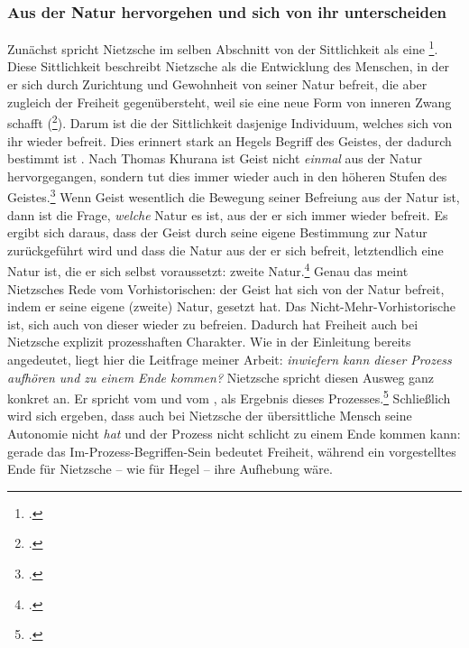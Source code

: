 \documentclass[12pt, a4paper, openany]{report}
\begin{document}
\subsubsection{Aus der Natur hervorgehen und sich von ihr unterscheiden}
Zunächst spricht Nietzsche im selben Abschnitt von der Sittlichkeit als eine \footcite[][293]{nietzsche_jenseits_2014}.
Diese Sittlichkeit beschreibt Nietzsche als die Entwicklung des Menschen, in der er sich durch Zurichtung und Gewohnheit von seiner Natur befreit, die aber zugleich der Freiheit gegenübersteht, weil sie eine neue Form von inneren Zwang schafft (\footcite[][292]{nietzsche_jenseits_2014}).
Darum ist die  der Sittlichkeit dasjenige Individuum, welches sich von ihr wieder befreit.
Dies erinnert stark an Hegels Begriff des Geistes, der dadurch bestimmt ist .
Nach Thomas Khurana ist Geist nicht \emph{einmal} aus der Natur hervorgegangen, sondern tut dies immer wieder auch in den höheren Stufen des Geistes.\footcite[Vgl.][294]{khurana_freiheit_2017}
Wenn Geist wesentlich die Bewegung seiner Befreiung aus der Natur ist, dann ist die Frage, \emph{welche} Natur es ist, aus der er sich immer wieder befreit. 
Es ergibt sich daraus, dass der Geist durch seine eigene Bestimmung zur Natur zurückgeführt wird und dass die Natur aus der er sich befreit, letztendlich eine Natur ist, die er sich selbst voraussetzt: zweite Natur.\footcite[Vgl.][320]{khurana_freiheit_2017}
Genau das meint Nietzsches Rede vom Vorhistorischen: 
der Geist hat sich von der Natur befreit, indem er seine eigene (zweite) Natur, gesetzt hat.
Das Nicht-Mehr-Vorhistorische ist, sich auch von dieser wieder zu befreien.
Dadurch hat Freiheit auch bei Nietzsche explizit prozesshaften Charakter. 
Wie in der Einleitung bereits angedeutet, liegt hier die Leitfrage meiner Arbeit: \emph{inwiefern kann dieser Prozess aufhören und zu einem Ende kommen?}
Nietzsche spricht diesen Ausweg ganz konkret an. 
Er spricht vom  und vom , als Ergebnis dieses Prozesses.\footcite[][293]{nietzsche_jenseits_2014} 
Schließlich wird sich ergeben, dass auch bei Nietzsche der übersittliche Mensch seine Autonomie nicht \emph{hat} und der Prozess nicht schlicht zu einem Ende kommen kann:
gerade das Im-Prozess-Begriffen-Sein bedeutet Freiheit, während ein vorgestelltes Ende für Nietzsche -- wie für Hegel -- ihre Aufhebung wäre.
\\
\end{document}
